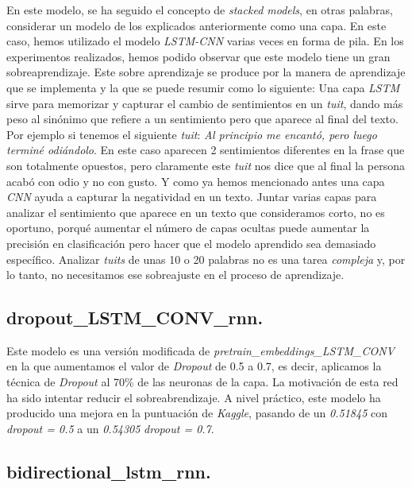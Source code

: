 \documentclass[11pt]{article}
\begin{document}
En este modelo, se ha seguido el concepto de \textit{stacked models}, en otras palabras, considerar un modelo de los explicados anteriormente como una capa. En este caso, hemos utilizado el modelo \textit{LSTM-CNN} varias veces en forma de pila. En los experimentos realizados, hemos podido observar que este modelo tiene un gran sobreaprendizaje. Este sobre aprendizaje se produce por la manera de aprendizaje que se implementa y la que se puede resumir como lo siguiente: Una capa \textit{LSTM} sirve para memorizar y capturar el cambio de sentimientos en un \textit{tuit}, dando más peso al sinónimo que refiere a un sentimiento pero que aparece al final del texto. Por ejemplo si tenemos el siguiente \textit{tuit}: \textit{Al principio me encantó, pero luego terminé odiándolo}. En este caso aparecen 2 sentimientos diferentes en la frase que son totalmente opuestos, pero claramente este \textit{tuit} nos dice que al final la persona acabó con odio y no con gusto. Y como ya hemos mencionado antes una capa \textit{CNN} ayuda a capturar la negatividad en un texto. Juntar varias capas para analizar el sentimiento que aparece en un texto que consideramos corto, no es oportuno, porqué aumentar el número de capas ocultas puede aumentar la precisión en clasificación pero hacer que el modelo aprendido sea demasiado específico. Analizar \textit{tuits} de unas 10 o 20 palabras no es una tarea \textit{compleja} y, por lo tanto, no necesitamos ese sobreajuste en el proceso de aprendizaje.




\subsection{dropout\_LSTM\_CONV\_rnn.} \label{dropoutLSTMCONVrnn}

Este modelo es una versión modificada de \textit{pretrain\_embeddings\_LSTM\_CONV} en la que aumentamos el valor de \textit{Dropout} de 0.5 a 0.7, es decir, aplicamos la técnica de \textit{Dropout} al 70\% de las neuronas de la capa. La motivación de esta red ha sido intentar reducir el sobreabrendizaje. A nivel práctico, este modelo ha producido una mejora en la puntuación de \textit{Kaggle}, pasando de un \textit{0.51845} con \textit{dropout = 0.5} a un \textit{0.54305} \textit{dropout = 0.7}.



\subsection{bidirectional\_lstm\_rnn.} \label{bidirectionallstmrnn}
\end{document}
